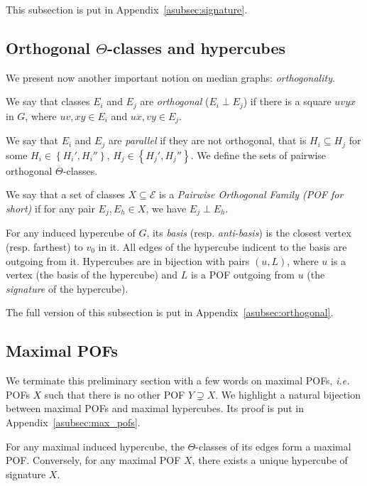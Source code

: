 \documentclass[a4paper,UKenglish,numberwithinsect,cleveref, autoref,anonymous]{lipics-v2021}
\newcommand{\set}[1]{\left\{ #1 \right\}}
\begin{document}
This subsection is put in Appendix~\ref{asubsec:signature}.

\subsection{Orthogonal $\Theta$-classes and hypercubes}

We present now another important notion on median graphs: \textit{orthogonality}.

\begin{definition}
We say that classes $E_i$ and $E_j$ are {\em orthogonal} ($E_i \perp E_j$) if there is a square $uvyx$ in $G$, where $uv,xy \in E_i$ and $ux,vy \in E_j$.
\end{definition}

We say that $E_i$ and $E_j$ are \textit{parallel} if they are not orthogonal, that is $H_i \subseteq H_j$ for some $H_i \in \set{H_i',H_i''}$, $H_j \in \set{H_j',H_j''}$. 
We define the sets of pairwise orthogonal $\Theta$-classes.

\begin{definition}
We say that a set of classes $X \subseteq \mathcal{E}$ is a {\em Pairwise Orthogonal Family (POF for short)} if for any pair $E_j,E_h \in X$, we have $E_j \perp E_h$.
\end{definition}

For any induced hypercube of $G$, its \textit{basis} (resp. \textit{anti-basis}) is the closest vertex (resp. farthest) to $v_0$ in it. All edges of the hypercube indicent to the basis are outgoing from it. Hypercubes are in bijection with pairs $(u,L)$, where $u$ is a vertex (the basis of the hypercube) and $L$ is a POF outgoing from $u$ (the \textit{signature} of the hypercube).

The full version of this subsection is put in Appendix~\ref{asubsec:orthogonal}.

\subsection{Maximal POFs} \label{subsec:max_pofs}

We terminate this preliminary section with a few words on maximal POFs, {\em i.e.} POFs $X$ such that there is no other POF $Y \supsetneq X$. We highlight a natural bijection between maximal POFs and maximal hypercubes. Its proof is put in Appendix~\ref{asubsec:max_pofs}.

\begin{theorem}[\ref{th:maximal_pofs}]
For any maximal induced hypercube, the $\Theta$-classes of its edges form a maximal POF.
Conversely, for any maximal POF $X$, there exists a unique hypercube of signature $X$. 
\label{th:maximal_pofs_teaser}
\end{theorem}
\end{document}

